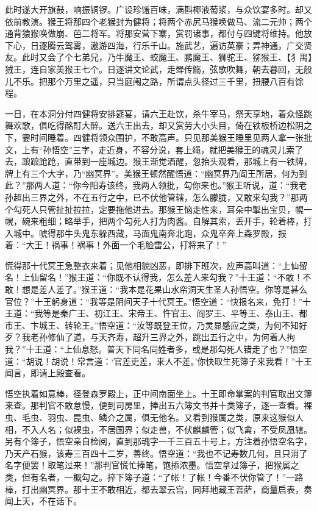 \documentclass[12pt]{lsbook}
\begin{document}
此时遂大开旗鼓，响振铜锣。广设珍馐百味，满斟椰液萄浆，与众饮宴多时。却又依前教演。猴王将那四个老猴封为健将；将两个赤尻马猴唤做马、流二元帅；两个通背猿猴唤做崩、芭二将军。将那安营下寨，赏罚诸事，都付与四键将维持。他放下心，日逐腾云驾雾，遨游四海，行乐千山。施武艺，遍访英豪；弄神通，广交贤友。此时又会了个七弟兄，乃牛魔王、蛟魔王、鹏魔王、狮驼王、猕猴王、【犭禺】狨王，连自家美猴王七个。日逐讲文论武，走斝传觞，弦歌吹舞，朝去暮回，无般儿不乐。把那个万里之遥，只当庭闱之路，所谓点头径过三千里，扭腰八百有馀程。

一日，在本洞分付四健将安排筵宴，请六王赴饮，杀牛宰马，祭天享地，着众怪跳舞欢歌，俱吃得酩酊大醉。送六王出去，却又赏劳大小头目，倚在铁板桥边松阴之下，霎时间睡着。四健将领众围护，不敢高声。只见那美猴王睡里见两人拿一张批文，上有“孙悟空”三字，走近身，不容分说，套上绳，就把美猴王的魂灵儿索了去，踉踉跄跄，直带到一座城边。猴王渐觉酒醒，忽抬头观看，那城上有一铁牌，牌上有三个大字，乃“幽冥界”。美猴王顿然醒悟道：“幽冥界乃阎王所居，何为到此？”那两人道：“你今阳寿该终，我两人领批，勾你来也。”猴王听说，道：“我老孙超出三界之外，不在五行之中，已不伏他管辖，怎么朦胧，又敢来勾我？”那两个勾死人只管扯扯拉拉，定要拖他进去。那猴王恼走性来，耳朵中掣出宝贝，幌一幌，碗来粗细；略举手，把两个勾死人打为肉酱。自解其索，丢开手，轮着棒，打入城中。唬得那牛头鬼东躲西藏，马面鬼南奔北跑，众鬼卒奔上森罗殿，报着：“大王！祸事！祸事！外面一个毛脸雷公，打将来了！”

慌得那十代冥王急整衣来着；见他相貌凶恶，即排下班次，应声高叫道：“上仙留名！上仙留名！”猴王道：“你既不认得我，怎么差人来勾我？”十王道：“不敢！不敢！想是差人差了。”猴王道：“我本是花果山水帘洞天生圣人孙悟空。你等是甚么官位？”十王躬身道：“我等是阴间天子十代冥王。”悟空道：“快报名来，免打！”十王道：“我等是秦广王、初江王、宋帝王、忤官王、阎罗王、平等王、泰山王、都市王、卞城王、转轮王。”悟空道：“汝等既登王位，乃灵显感应之类，为何不知好歹？我老孙修仙了道，与天齐寿，超升三界之外，跳出五行之中，为何着人拘我？”十王道：“上仙息怒。普天下同名同姓者多，或是那勾死人错走了也？”悟空道：“胡说！胡说！常言道：‘官差吏差，来人不差。’你快取生死簿子来我看！”十王闻言，即请上殿查看。

悟空执着如意棒，径登森罗殿上，正中间南面坐上。十王即命掌案的判官取出文簿来查。那判官不敢怠慢，便到司房里，捧出五六簿文书并十类簿子，逐一查看。裸虫、毛虫、羽虫、昆虫、鳞介之属，俱无他名。又看到猴属之类，原来这猴似人相，不入人名；似裸虫，不居国界；似走兽，不伏麒麟管；似飞禽，不受凤凰辖。另有个簿子，悟空亲自检阅，直到那魂字一千三百五十号上，方注着孙悟空名字，乃天产石猴，该寿三百四十二岁，善终。悟空道：“我也不记寿数几何，且只消了名字便罢！取笔过来！”那判官慌忙捧笔，饱掭浓墨。悟空拿过簿子，把猴属之类，但有名者，一概勾之。捽下簿子道：“了帐！了帐！今番不伏你管了！”一路棒，打出幽冥界。那十王不敢相近，都去翠云宫，同拜地藏王菩萨，商量启表，奏闻上天，不在话下。
\end{document}
